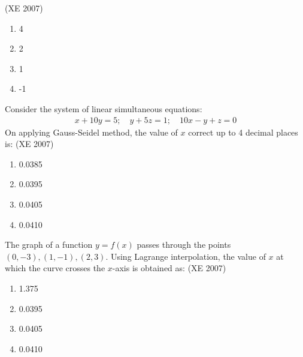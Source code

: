   \hfill{(XE 2007)}
    \begin{multicols}{4}
    \begin{enumerate}
        \item 4
        \item 2
        \item 1
        \item -1
    \end{enumerate}
    \end{multicols}
\item Consider the system of linear simultaneous equations:
\begin{align}
    x + 10y = 5;\quad y + 5z = 1; \quad 10x - y + z = 0
\end{align}
    On applying Gauss-Seidel method, the value of $x$ correct up to 4 decimal places is:
  \hfill{(XE 2007)}
    \begin{multicols}{4}
    \begin{enumerate}
        \item 0.0385
        \item 0.0395
        \item 0.0405
        \item 0.0410
    \end{enumerate}
    \end{multicols}
\item The graph of a function $y = f(x)$ passes through the points $(0, -3), (1, -1), (2, 3)$. Using Lagrange interpolation, the value of $x$ at which the curve crosses the $x$-axis is obtained as:
  \hfill{(XE 2007)}
    \begin{multicols}{4}
    \begin{enumerate}
    \item 1.375
    \item 0.0395
    \item 0.0405
    \item 0.0410
    \end{enumerate}
 \end{multicols}
 
